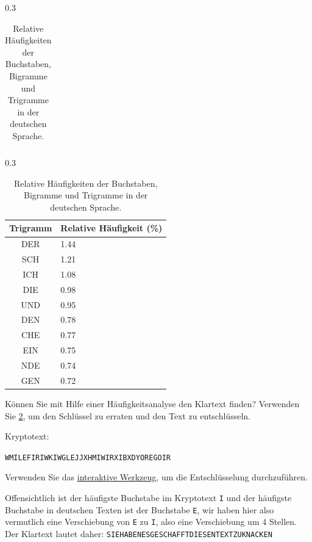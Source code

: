\begin{table}[H]
\begin{subtable}[t]{0.3\textwidth}
\begin{tabular}{cp{1.9cm}}
		\end{tabular}
		\caption{Bigrammhäufigkeit}
	\end{subtable}
	\hspace{0.5cm}
	\begin{subtable}[t]{0.3\textwidth}
		\centering
		\begin{tabular}{cp{1.9cm}}
			\textbf{Trigramm} & Relative Häufigkeit (\%) \\ \midrule
			DER               & 1.44                     \\
			SCH               & 1.21                     \\
			ICH               & 1.08                     \\
			DIE               & 0.98                     \\
			UND               & 0.95                     \\
			DEN               & 0.78                     \\
			CHE               & 0.77                     \\
			EIN               & 0.75                     \\
			NDE               & 0.74                     \\
			GEN               & 0.72                     \\
		\end{tabular}
		\caption{Trigrammhäufigkeit}
	\end{subtable}
	\caption{Relative Häufigkeiten der Buchstaben, Bigramme und Trigramme in der deutschen Sprache.}
	\label{tab:alle-haeufigkeiten}
\end{table}

\begin{myexercise}\label{ex:caesar}
	Können Sie mit Hilfe einer Häufigkeitsanalyse den Klartext finden? Verwenden Sie \cref{tab:alle-haeufigkeiten}, um den Schlüssel zu erraten und den Text zu entschlüsseln.

	Kryptotext:

	\texttt{WMILEFIRIWKIWGLEJJXHMIWIRXIBXDYOREGOIR}

	Verwenden Sie das \href{https://www.101computing.net/cipher-wheel.html}{interaktive Werkzeug}, um die Entschlüsselung durchzuführen.

	\begin{myanswer}
		Offensichtlich ist der häufigste Buchstabe im Kryptotext \texttt{I} und der häufigste Buchstabe in deutschen Texten ist der Buchstabe \texttt{E}, wir haben hier also vermutlich eine Verschiebung von \texttt{E} zu \texttt{I}, also eine Verschiebung um 4 Stellen. Der Klartext lautet daher: \texttt{SIEHABENESGESCHAFFTDIESENTEXTZUKNACKEN}
	\end{myanswer}
\end{myexercise}

